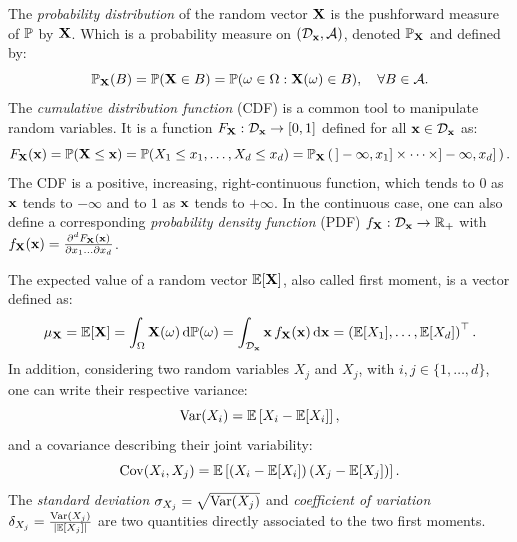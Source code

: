 The \textit{probability distribution} of the random vector $\bX$ is the pushforward measure of $\P$ by $\bX$. 
Which is a probability measure on $(\iD_{\bx}, \iA)$, denoted $\P_{\bX}$ and defined by: 
\begin{equation}
    \P_{\bX}(B) = \P(\bX \in B) = \P(\omega \in \Omega : \bX(\omega)\in B), \quad \forall B \in \iA.
\end{equation}
The \textit{cumulative distribution function} (CDF) is a common tool to manipulate random variables. 
It is a function $F_{\bX} : \iD_{\bx} \rightarrow [0, 1]$ defined for all $\bx \in \iD_{\bx}$ as: 
\begin{equation}
    F_{\bX}(\bx) = \P(\bX \leq \bx)
            = \P(X_1 \leq x_1, \dots, X_d \leq x_d)
            = \P_{\bX}\left(\, ]-\infty, x_1] \times \dots \times ]-\infty, x_d]\, \right).
\end{equation}
The CDF is a positive, increasing, right-continuous function, which tends to $0$ as $\bx$ tends to $-\infty$ and to $1$ as $\bx$ tends to $+\infty$. 
In the continuous case, one can also define a corresponding \textit{probability density function} (PDF) $f_{\bX}: \iD_{\bx} \rightarrow \R_+$  with 
$f_{\bX}(\bx) = \frac{\partial^d F_{\bX}(\bx)}{\partial x_1 \dots \partial x_d}$.

The expected value of a random vector $\E[\bX]$, also called first moment, is a vector defined as:
\begin{equation}
    \mu_{\bX} = \E[\bX] = \int_{\Omega} \bX(\omega) \,\dd \P(\omega) =  \int_{\iD_{\bx}} \bx \, f_{\bX}(\bx) \, \dd\bx = \left(\E[X_1], \dots, \E[X_d]\right)\TT.
\end{equation}
In addition, considering two random variables $X_j$ and $X_j$, with $i, j \in \{1, \dots, d\}$, one can write their respective variance:
\begin{equation}
    \var(X_i) = \E\left[X_i - \E[X_i]\right],
\end{equation}
and a covariance describing their joint variability:
\begin{equation}
    \cov(X_i, X_j) = \E\left[\left(X_i - \E[X_i]\right) \left(X_j - \E[X_j]\right)\right].
\end{equation}
The \textit{standard deviation} $\sigma_{X_j} = \sqrt{\var(X_j)}$ and \textit{coefficient of variation} $\delta_{X_j} = \frac{\var(X_j)}{|\E[X_j]|}$ are two quantities directly associated to the two first moments.



